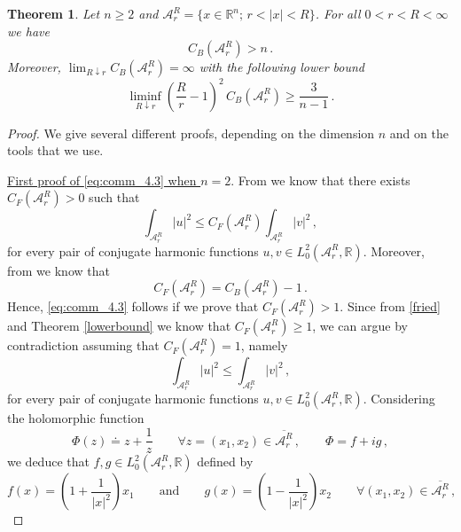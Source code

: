 \documentclass[11pt]{article}
\newtheorem{theorem}{Theorem}[section]
\theoremstyle{plain}
\theoremstyle{definition}
\numberwithin{equation}{section}
\newcommand{\R}{\mathbb{R}}
\begin{document}
\begin{theorem}\label{thm:comm_4.1}
Let $n\ge2$ and $\mathcal{A}_r^R=\{x\in\R^n;\, r<|x|<R\}$. For all $0<r<R<\infty$ we have
\begin{equation}\label{eq:comm_4.3}
C_B(\mathcal{A}_r^R)>n\, .
\end{equation}
Moreover, $\displaystyle\lim_{R\downarrow r}C_B(\mathcal{A}_r^R)=\infty$ with the following lower bound
\begin{equation}\label{asymptoticannulus}
\liminf_{R\downarrow r}\left(\frac{R}{r}-1\right)^2\, C_B(\mathcal{A}_r^R)\ge\frac{3}{n-1}\, .
\end{equation}	
\end{theorem}
\noindent
\begin{proof} We give several different proofs, depending on the dimension $n$ and on the tools that we use.\par
\underline{First proof of \eqref{eq:comm_4.3} when $n=2$}. From \cite{friedrichs1937certain} we know that there exists
$C_{F}(\mathcal{A}_r^R) > 0$ such that
$$
\int_{\mathcal{A}_r^R} |u|^2 \leq C_{F}(\mathcal{A}_r^R) \int_{\mathcal{A}_r^R} |v|^2 \, ,
$$
for every pair of conjugate harmonic functions $u, v \in L^2_0(\mathcal{A}_r^R,\R)$. Moreover, from \cite[Theorem 2.1]{costabel} we know that
\begin{equation}\label{fried}
C_{F}(\mathcal{A}_r^R) = C_{B}(\mathcal{A}_r^R) - 1 \, .
\end{equation}
Hence, \eqref{eq:comm_4.3} follows if we prove that $C_{F}(\mathcal{A}_r^R)>1$.
Since from \eqref{fried} and Theorem \ref{lowerbound} we know that $C_{F}(\mathcal{A}_r^R)\geq1$, we can argue by contradiction assuming that $C_{F}(\mathcal{A}_r^R) = 1$, namely
\begin{equation} \label{contra}
\int_{\mathcal{A}_r^R} |u|^2 \leq \int_{\mathcal{A}_r^R} |v|^2 \, ,
\end{equation}
for every pair of conjugate harmonic functions $u, v \in L^2_0(\mathcal{A}_r^R,\R)$. Considering the holomorphic function
\begin{equation}\label{zhuk}
\Phi(z) \doteq z + \dfrac{1}{z} \qquad \forall z=(x_1,x_2)\in \overline{\mathcal{A}_r^R} \, ,\qquad\Phi=f+ig\, ,
\end{equation}
we deduce that $f,g\in L^2_0(\mathcal{A}_r^R,\R)$ defined by
\begin{equation}\label{realimaginary}
f(x)=\left( 1 + \dfrac{1}{|x|^2} \right) x_1 \qquad \text{and} \qquad g(x)=\left( 1 - \dfrac{1}{|x|^2} \right) x_2 \qquad \forall (x_1,x_2) \in \overline{\mathcal{A}_r^R} \, ,

\end{equation}
\end{proof}
\end{document}
